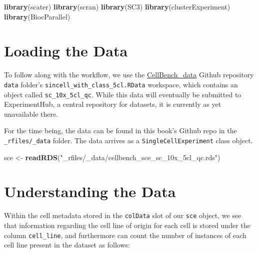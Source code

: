 \documentclass[]{book}
\newenvironment{Shaded}{\begin{snugshade}}{\end{snugshade}}
\newcommand{\KeywordTok}[1]{\textcolor[rgb]{0.13,0.29,0.53}{\textbf{#1}}}
\newcommand{\NormalTok}[1]{#1}
\newcommand{\OperatorTok}[1]{\textcolor[rgb]{0.81,0.36,0.00}{\textbf{#1}}}
\newcommand{\StringTok}[1]{\textcolor[rgb]{0.31,0.60,0.02}{#1}}
\begin{document}
\begin{Shaded}
\begin{Highlighting}[]
\KeywordTok{library}\NormalTok{(scater)}
\KeywordTok{library}\NormalTok{(scran)}
\KeywordTok{library}\NormalTok{(SC3)}
\KeywordTok{library}\NormalTok{(clusterExperiment)}
\KeywordTok{library}\NormalTok{(BiocParallel)}
\end{Highlighting}
\end{Shaded}

\hypertarget{loading-the-data-2}{%
\section{Loading the Data}\label{loading-the-data-2}}

To follow along with the workflow, we use the \href{https://github.com/LuyiTian/CellBench_data}{CellBench\_data} Github repository \texttt{data} folder's \texttt{sincell\_with\_class\_5cl.RData} workspace, which contains an object called \texttt{sc\_10x\_5cl\_qc}. While this data will eventually be submitted to ExperimentHub, a central repository for datasets, it is currently as yet unavailable there.

For the time being, the data can be found in this book's Github repo in the \texttt{\_rfiles/\_data} folder. The data arrives as a \texttt{SingleCellExperiment} class object.

\begin{Shaded}
\begin{Highlighting}[]
\NormalTok{sce <-}\StringTok{ }\KeywordTok{readRDS}\NormalTok{(}\StringTok{"_rfiles/_data/cellbench_sce_sc_10x_5cl_qc.rds"}\NormalTok{)}
\end{Highlighting}
\end{Shaded}

\hypertarget{understanding-the-data}{%
\section{Understanding the Data}\label{understanding-the-data}}

Within the cell metadata stored in the \texttt{colData} slot of our \texttt{sce} object, we see that information regarding the cell line of origin for each cell is stored under the column \texttt{cell\_line}, and furthermore can count the number of instances of each cell line present in the dataset as follows:

\begin{Shaded}
\end{Shaded}
\end{document}
